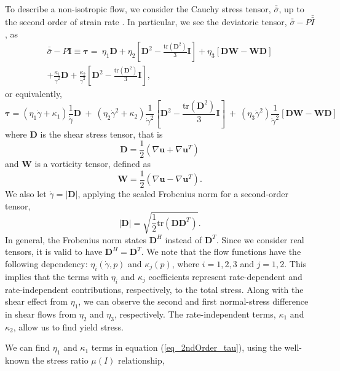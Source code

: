 To describe a non-isotropic flow, we consider the Cauchy stress tensor, $\bar{\bar{\sigma}}$, up to the second order of strain rate \cite{srivastava_viscometric_2021}. In particular, we see the deviatoric tensor, $\bar{\bar{\sigma}} - P \bar{\bar{I}}$, as 
\begin{align*}
\bar{\bar{\sigma}} - P {\bm I} \equiv
  {\bm {\bm \tau}}
  =  \ \eta_1 {\bm D} 
  + \eta_2  \left[ {\bm D}^2  - \frac{\text{tr}\left({\bm D}^2\right)}{3}{\bm I} \right]
  + \eta_3  \left[ {\bm D}{\bm W} - {\bm W}{\bm D} \right]
  \nonumber \\
  + \frac{\kappa_1}{\dot{\gamma }^2} \bm D 
  + \frac{\kappa_2}{\dot{\gamma }^2}  \left[ {\bm D}^2  
  - \frac{\text{tr}\left({\bm D}^2\right)}{3}{\bm I} \right],
\end{align*}
or equivalently, 
\begin{equation}
  {\bm {\bm \tau}}
  = \left( \eta_1 \dot{\gamma}+ \kappa_1 \right) \frac{1}{\dot{\gamma}} {\bm D}
  \ +  \ 
  \left( \eta_2  \dot{\gamma}^2
  +  \kappa_2 
  \right) \frac{1}{\dot{\gamma}^2}
  \left[ {\bm D}^2  - \frac{\text{tr}\left({\bm D}^2\right)}{3}{\bm I} \right]
  \ + \
  \left( \eta_3 \dot{\gamma}^2 \right)
  \frac{1}{\dot{\gamma}^2}
    \left[ {\bm D}{\bm W} - {\bm W}{\bm D} \right]
\label{eq_2ndOrder_tau}
\end{equation}
where ${\bm D} $ is the shear stress tensor, that is
\[
	{\bm D} = \frac{1}{2}\left( \nabla {\bm u} + \nabla {\bm u}^{T}\right)	
\]
and ${\bm W}$ is a vorticity tensor, defined as 
\[
	{\bm W} = \frac{1}{2}\left( \nabla {\bm u} - \nabla {\bm u}^{T}\right).
\]
We also let $\dot{\gamma} = \left| {\bm D} \right|$, applying the scaled Frobenius norm for a second-order tensor, 
\[
    |\bm{D}| = \sqrt{\frac{1}{2}
    \text{tr}\left(\bm{D} \bm{D}^{T} \right)}.
\]
In general, the Frobenius norm states $\bm{D}^H$ instead of $\bm{D}^T$. Since we consider real tensors, it is valid to have $\bm{D}^H = \bm{D}^T$.
We note that the flow functions have the following dependency: $\eta_i(\dot{\gamma}, p)$ and $\kappa_j (p)$, where $i = 1,2,3$ and $j = 1,2$. 
This implies that the terms with $\eta_i$ and $\kappa_j$ coefficients represent rate-dependent and rate-independent contributions, respectively, to the total stress.
Along with the shear effect from $\eta_1$, we can observe the second and first normal-stress difference in shear flows from $\eta_2$ and $\eta_3$, respectively. The rate-independent terms, $\kappa_1$ and $\kappa_2$, allow us to find yield stress. 
\par
We can find $\eta_1$ and $\kappa_1$ terms in equation (\ref{eq_2ndOrder_tau}), using the well-known the stress ratio $\mu(I)$ relationship,
